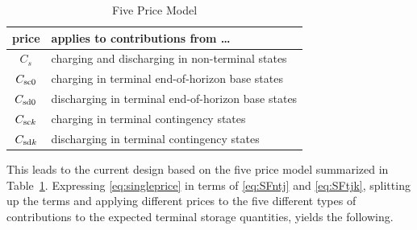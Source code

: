\documentclass[12pt]{article}
\numberwithin{equation}{section}
\numberwithin{table}{section}
\numberwithin{figure}{section}
\begin{document}
\begin{table}[!ht]
\centering
\begin{threeparttable}
\caption{Five Price Model}
\label{tab:fivepricemodel}
\footnotesize
\begin{tabular}{cl}
\toprule
price & applies to contributions from \dots \\
\midrule
$C_{s}$	& charging and discharging in non-terminal states	\\
$C_{\rm sc0}$	& charging in terminal end-of-horizon base states	\\
$C_{\rm sd0}$	& discharging in terminal end-of-horizon base states	\\
$C_{{\rm sc}k}$	& charging in terminal contingency states	\\
$C_{{\rm sd}k}$	& discharging in terminal contingency states	\\
\bottomrule
\end{tabular}
\end{threeparttable}
\end{table}

This leads to the current design based on the five price model summarized in Table~\ref{tab:fivepricemodel}. Expressing \eqref{eq:singleprice} in terms of \eqref{eq:SFntj} and \eqref{eq:SFtjk}, splitting up the terms and applying different prices to the five different types of contributions to the expected terminal storage quantities, yields the following.
\end{document}
